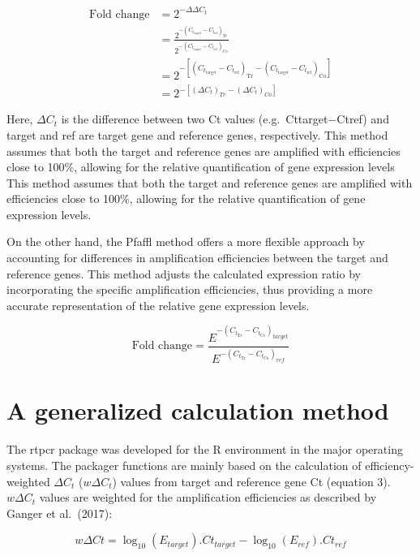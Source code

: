 \documentclass[
]{article}
\begin{document}
\[\begin{align*}
\text{Fold change} & = 2^{-\Delta\Delta C_t} \\
& = \frac{2^{-(C_{t_{\text{target}}}-C_{t_{\text{ref}}})_{Tr}}}
{2^{-(C_{t_{\text{target}}}-C_{t_{\text{ref}}})_{Co}}} \\ 
& =2^{-[(C_{t_{\text{target}}}-C_{t_{\text{ref}}})_{\text{Tr}}-
{(C_{t_{\text{target}}}-C_{t_{\text{ref}}})}_{\text{Co}}]} \\ 
& = 2^{-[{(\Delta C_t)_{Tr} - (\Delta C_t)_{Co}}]}
\end{align*}\]

Here, \(\Delta C_t\) is the difference between two Ct values
(e.g.~Cttarget−Ctref) and target and ref are target gene and reference
genes, respectively. This method assumes that both the target and
reference genes are amplified with efficiencies close to 100\%, allowing
for the relative quantification of gene expression levels This method
assumes that both the target and reference genes are amplified with
efficiencies close to 100\%, allowing for the relative quantification of
gene expression levels.

On the other hand, the Pfaffl method offers a more flexible approach by
accounting for differences in amplification efficiencies between the
target and reference genes. This method adjusts the calculated
expression ratio by incorporating the specific amplification
efficiencies, thus providing a more accurate representation of the
relative gene expression levels.

\[\text{Fold change} = \frac{E^{-(C_{t_{\text{Tr}}}-C_{t_{\text{Co}}})_{target}}}
{E^{-(C_{t_{\text{Tr}}}-C_{t_{\text{Co}}})_{ref}}}\]

\hypertarget{a-generalized-calculation-method}{%
\section{A generalized calculation
method}\label{a-generalized-calculation-method}}

The rtpcr package was developed for the R environment in the major
operating systems. The packager functions are mainly based on the
calculation of efficiency-weighted \(\Delta C_t\) (\(w\Delta C_t\))
values from target and reference gene Ct (equation 3). \(w\Delta C_t\)
values are weighted for the amplification efficiencies as described by
Ganger et al.~(2017):

\[w\Delta Ct =\log_{10}(E_{target}).Ct_{target}-\log_{10}(E_{ref}).Ct_{ref}\]
\end{document}
